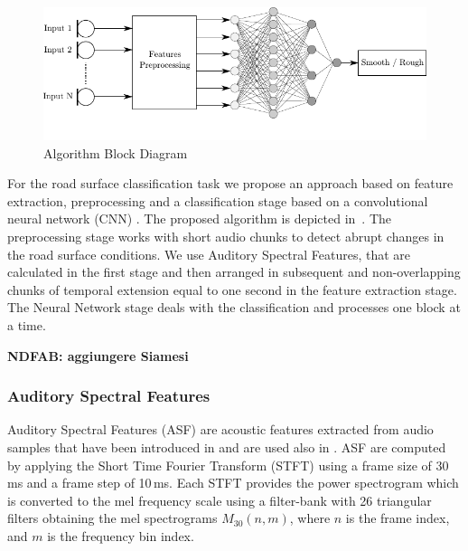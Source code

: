\begin{figure}[h]
	\centering
	\includegraphics[width=1.0\linewidth]{img/flowchart_1.pdf}
	\caption{Algorithm Block Diagram}
	\label{fig:algoritmo-orizzontale}
\end{figure}


For the road surface classification task we propose an approach based on feature extraction, preprocessing and a classification stage based on a convolutional neural network (CNN) \cite{lecun1995convolutional}. The proposed algorithm is depicted in~. The preprocessing stage works with short audio chunks to detect abrupt changes in the road surface conditions. We use Auditory Spectral Features, that are calculated in the first stage and then arranged in subsequent and non-overlapping chunks of temporal extension equal to one second in the feature extraction stage. The Neural Network stage deals with the classification and processes one block at a time.

\textbf{NDFAB: aggiungere Siamesi}

\subsubsection{Auditory Spectral Features}

Auditory Spectral Features (ASF) are acoustic features extracted from audio samples that have been introduced in \cite{eyben2010universal} and are used also in \cite{abdic2016detecting}. ASF are computed by applying the Short Time Fourier Transform (STFT) using a frame size of 30\,ms and a frame step of 10\,ms. Each STFT provides the power spectrogram which is converted to the mel frequency scale using a filter-bank with 26 triangular filters obtaining the mel spectrograms $M_{30}(n,m)$, where $n$ is the
frame index, and $m$ is the frequency bin index.

